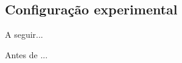 



\subsection{Configuração experimental}
\label{subsec:configuracaoexperimental}

% 




  



























A seguir...

Antes de ...



	









